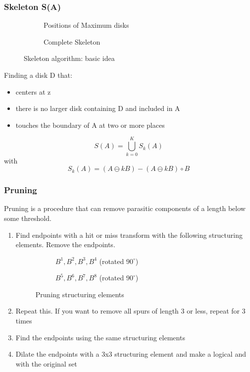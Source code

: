 \subsubsection{Skeleton S(A)}
\begin{figure}[h!]
\centering
\begin{subfigure}[b]{0.45\textwidth}
\centering
{}
\caption{Positions of Maximum disks}
\end{subfigure}
\begin{subfigure}[b]{0.45\textwidth}
\centering
{}
\caption{Complete Skeleton}
\end{subfigure}
\caption{Skeleton algorithm: basic idea}
\end{figure}
Finding a disk D that:
\begin{itemize}
\item centers at z
\item there is no larger disk containing D and included in A
\item touches the boundary of A at two or more places
\end{itemize}
	\[
		S(A) = \bigcup_{k=0}^{K} S_k(A)
	\]
with
	\[
		S_k(A) = (A \ominus kB) - (A \ominus kB) \circ B
	\]
	
\subsubsection{Pruning}
Pruning is a procedure that can remove parasitic components of a length below some threshold.\\
\begin{enumerate}
\item Find endpoints with a hit or miss transform with the following structuring elements. Remove the endpoints.
\begin{figure}[h!]
\centering
\begin{subfigure}[b]{0.45\textwidth}
\centering
{}
\caption{$B^1, B^2, B^3, B^4$ (rotated $90^\circ$)}
\end{subfigure}
\begin{subfigure}[b]{0.45\textwidth}
\centering
{}
\caption{$B^5, B^6, B^7, B^8$ (rotated $90^\circ$)}
\end{subfigure}
\caption{Pruning structuring elements}
\end{figure}
\item Repeat this. If you want to remove all spurs of length 3 or less, repeat for 3 times
\item Find the endpoints using the same structuring elements
\item Dilate the endpoints with a 3x3 structuring element and make a logical and with the original set
\end{enumerate}

